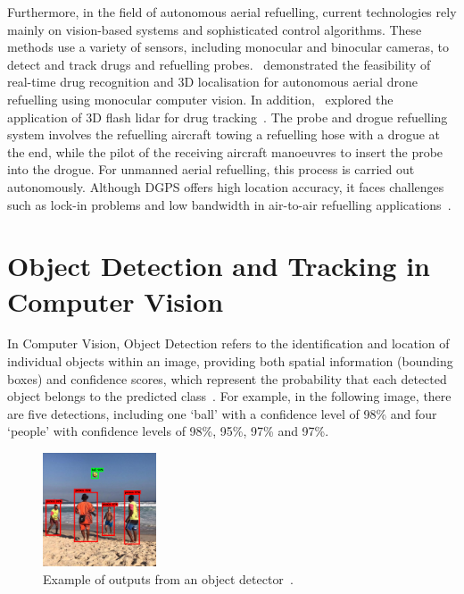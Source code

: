 \documentclass[12pt,oneside]{book} %
\begin{document}
Furthermore, in the field of autonomous aerial refuelling, current technologies
rely mainly on vision-based systems and sophisticated control algorithms. These
methods use a variety of sensors, including monocular and binocular cameras, to
detect and track drugs and refuelling probes.~\citet{AARCNN} demonstrated the
feasibility of real-time drug recognition and 3D localisation for autonomous
aerial drone refuelling using monocular computer vision. In
addition,~\citet{Chen2011} explored the application of 3D flash lidar for drug
tracking~\cite{AARCNN}. The probe and drogue refuelling system involves the
refuelling aircraft towing a refuelling hose with a drogue at the end, while
the pilot of the receiving aircraft manoeuvres to insert the probe into the
drogue. For unmanned aerial refuelling, this process is carried out
autonomously. Although DGPS offers high location accuracy, it faces challenges
such as lock-in problems and low bandwidth in air-to-air refuelling
applications~\cite{AAREKF}.

\newpage
\section{Object Detection and Tracking in Computer Vision}
In Computer Vision, Object Detection refers to the identification and location
of individual objects within an image, providing both spatial information
(bounding boxes) and confidence scores, which represent the probability that
each detected object belongs to the predicted
class~\cite{huggingface2023objectdetection}. For example, in the following
image, there are five detections, including one `ball' with a confidence level
of 98\% and four `people' with confidence levels of 98\%, 95\%, 97\% and 97\%.

\begin{figure}[H]
    \centering
    \includegraphics[width=0.3\textwidth]{figures/intro_object_detection.png}
    \caption{Example of outputs from an object detector~\cite{huggingface2023objectdetection}.}\label{fig:object-detection}
\end{figure}
\end{document}
